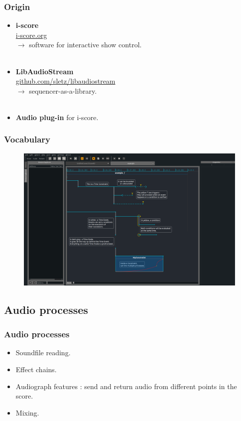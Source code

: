 \documentclass[draft]{beamer}
\begin{document}
\begin{frame}	
    \frametitle{Origin}    
    \Large
    \begin{itemize}
        \item \textbf{i-score}~\\ \url{i-score.org}~\\$\rightarrow$ software for interactive show control.~\\~\\
        \item \textbf{LibAudioStream}\\ \url{github.com/sletz/libaudiostream}~\\$\rightarrow$ sequencer-as-a-library.~\\~\\
        \item \textbf{Audio plug-in} for i-score.
    \end{itemize}   
     
\end{frame}


\begin{frame}
    \frametitle{Vocabulary}   
    \begin{figure}
        \centering
        \includegraphics[width=\textwidth]{images/screens/example.png}
        \end{figure}
\end{frame}

\subsection{Audio processes}
\begin{frame}	
    \frametitle{Audio processes}    
    \Large
    \begin{itemize}
        \item Soundfile reading.
        \item Effect chains.
        \item Audiograph features : send and return audio from different points in the score.
        \item Mixing.
    \end{itemize}    
\end{frame}
\end{document}

